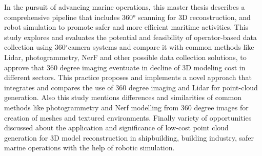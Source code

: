 


\noindent In the pursuit of advancing marine operations, this master thesis describes a comprehensive pipeline that includes 360° scanning for 3D reconstruction, and robot simulation to promote safer and more efficient maritime activities. This study explores and evaluates the potential and feasibility of operator-based data collection using 360$^{\circ}$camera systems and compare it with common methods like Lidar, photogrammetry, NerF and other possible data collection solutions, to approve that 360 degree imaging eventuate in decline of 3D modeling cost in different sectors. This practice proposes and implements a novel approach that integrates and compares the use of 360 degree imaging and Lidar for point-cloud generation. Also this study mentions differences and similarities of common methods like photogrammetry and Nerf modelling from 360 degree images for creation of meshes and textured environments. Finally variety of opportunities discussed about the application and significance of low-cost point cloud generation for 3D model reconstruction in shipbuilding, building industry, safer marine operations with the help of robotic simulation.  







